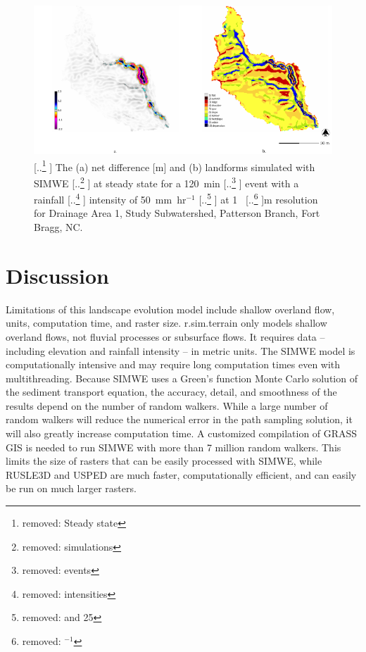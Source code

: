 \documentclass[gmd, manuscript]{copernicus}
\providecommand{\DIFadd}[1]{{\protect\color{blue} \sf #1}} %
\providecommand{\DIFdel}[1]{{\protect\color{red} [..\footnote{removed: #1} ]}} %
\providecommand{\DIFaddbegin}{} %
\providecommand{\DIFaddFL}[1]{\DIFadd{#1}} %
\providecommand{\DIFdelFL}[1]{\DIFdel{#1}} %
\providecommand{\DIFaddbeginFL}{} %
\providecommand{\DIFaddendFL}{} %
\providecommand{\DIFdelbeginFL}{} %
\providecommand{\DIFdelendFL}{} %
\begin{document}
\begin{figure}
\center
\includegraphics[width=\textwidth,height=0.95\textheight,keepaspectratio]{figures/simwe.pdf}
\caption{\DIFdelbeginFL \DIFdelFL{Steady state }\DIFdelendFL 
\DIFaddbeginFL \DIFaddFL{The (a) net difference }[\unit{m}] \DIFaddFL{and
(b) landforms
simulated with }\DIFaddendFL SIMWE \DIFdelbeginFL \DIFdelFL{simulations
}\DIFdelendFL \DIFaddbeginFL \DIFaddFL{at steady state 
}\DIFaddendFL for \DIFaddbeginFL \DIFaddFL{a }\DIFaddendFL 120~\unit{min} \DIFdelbeginFL \DIFdelFL{events }\DIFdelendFL \DIFaddbeginFL \DIFaddFL{event }\DIFaddendFL with \DIFaddbeginFL \DIFaddFL{a }\DIFaddendFL rainfall \DIFdelbeginFL \DIFdelFL{intensities }\DIFdelendFL \DIFaddbeginFL \DIFaddFL{intensity }\DIFaddendFL of 50~\unit{mm~hr}$^{-1}$
\DIFdelbeginFL \DIFdelFL{and 25}\DIFdelendFL \DIFaddbeginFL \DIFaddFL{at 1}\DIFaddendFL ~\DIFdelbeginFL %
\DIFdelFL{$^{-1}$}\DIFdelendFL \DIFaddbeginFL \unit{m} \DIFaddFL{resolution for
Drainage Area 1, Study Subwatershed, Patterson Branch, Fort Bragg, NC.
}\DIFaddendFL }
\label{fig:simwe_simulations}
\end{figure}

\DIFaddbegin \section{\DIFadd{Discussion}}

\DIFadd{Limitations of this landscape evolution model include
shallow overland flow, units, computation time, and raster size.
r.sim.terrain only models shallow overland flows, 
not fluvial processes or subsurface flows.
It requires data -- including 
elevation and rainfall intensity -- in metric units. 
The SIMWE model is computationally intensive 
and may require long computation times even with multithreading.
Because SIMWE uses a Green's function Monte Carlo solution 
of the sediment transport equation, 
the accuracy, detail, and smoothness of the results 
depend on the number of random walkers.
While a large number of random walkers will reduce the
numerical error in the path sampling solution,
it will also greatly increase computation time.
A customized compilation of GRASS GIS 
is needed to run SIMWE with more than 7 million random walkers.
This limits the size of rasters 
that can be easily processed with SIMWE,
while RUSLE3D and USPED are much faster, computationally efficient,
and can easily be run on much larger rasters. 
}
\end{document}
